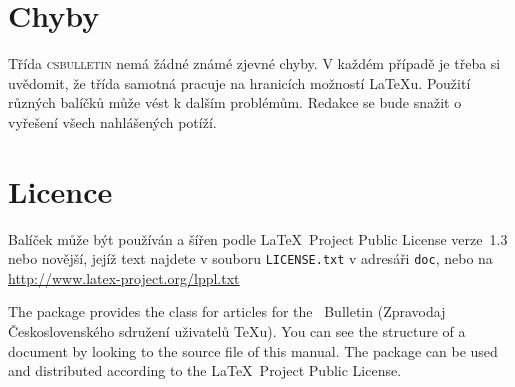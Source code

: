 \documentclass{csbulletin}
\let\pkg\textsc
\begin{document}
\section{Chyby}
Třída \pkg{csbulletin} nemá žádné známé zjevné chyby. V
každém případě je třeba si uvědomit, že třída samotná pracuje na hranicích možností \LaTeX{}u.
Použití různých balíčků může vést k dalším problémům. Redakce se bude snažit o vyřešení všech
nahlášených potíží.

\section{Licence}
Balíček může být používán a šířen podle \LaTeX\ Project Public License verze~1.3 nebo novější, jejíž
text najdete v souboru \texttt{LICENSE.txt} v adresáři \texttt{doc}, nebo na
\url{http://www.latex-project.org/lppl.txt}

\begin{summary}
The package provides the class for articles for the \cstug\ Bulletin (Zpravodaj Československého
sdružení uživatelů \TeX u). You can see the structure of a document by looking to the source file
of this manual. The package can be used and distributed according to the \LaTeX\ Project Public
License.
\end{summary}
\end{document}
